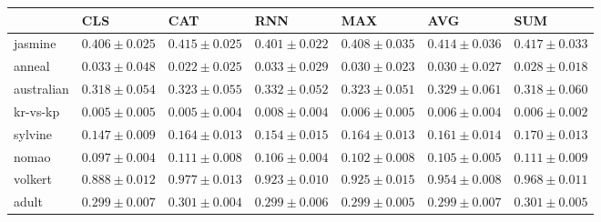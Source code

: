 \begin{tabular}{lllllll}
\toprule
 & CLS & CAT & RNN & MAX & AVG & SUM \\
\midrule
jasmine & $0.406 \pm 0.025$ & $0.415 \pm 0.025$ & $0.401 \pm 0.022$ & $0.408 \pm 0.035$ & $0.414 \pm 0.036$ & $0.417 \pm 0.033$ \\
anneal & $0.033 \pm 0.048$ & $0.022 \pm 0.025$ & $0.033 \pm 0.029$ & $0.030 \pm 0.023$ & $0.030 \pm 0.027$ & $0.028 \pm 0.018$ \\
australian & $0.318 \pm 0.054$ & $0.323 \pm 0.055$ & $0.332 \pm 0.052$ & $0.323 \pm 0.051$ & $0.329 \pm 0.061$ & $0.318 \pm 0.060$ \\
kr-vs-kp & $0.005 \pm 0.005$ & $0.005 \pm 0.004$ & $0.008 \pm 0.004$ & $0.006 \pm 0.005$ & $0.006 \pm 0.004$ & $0.006 \pm 0.002$ \\
sylvine & $0.147 \pm 0.009$ & $0.164 \pm 0.013$ & $0.154 \pm 0.015$ & $0.164 \pm 0.013$ & $0.161 \pm 0.014$ & $0.170 \pm 0.013$ \\
nomao & $0.097 \pm 0.004$ & $0.111 \pm 0.008$ & $0.106 \pm 0.004$ & $0.102 \pm 0.008$ & $0.105 \pm 0.005$ & $0.111 \pm 0.009$ \\
volkert & $0.888 \pm 0.012$ & $0.977 \pm 0.013$ & $0.923 \pm 0.010$ & $0.925 \pm 0.015$ & $0.954 \pm 0.008$ & $0.968 \pm 0.011$ \\
adult & $0.299 \pm 0.007$ & $0.301 \pm 0.004$ & $0.299 \pm 0.006$ & $0.299 \pm 0.005$ & $0.299 \pm 0.007$ & $0.301 \pm 0.005$ \\
\bottomrule
\end{tabular}
